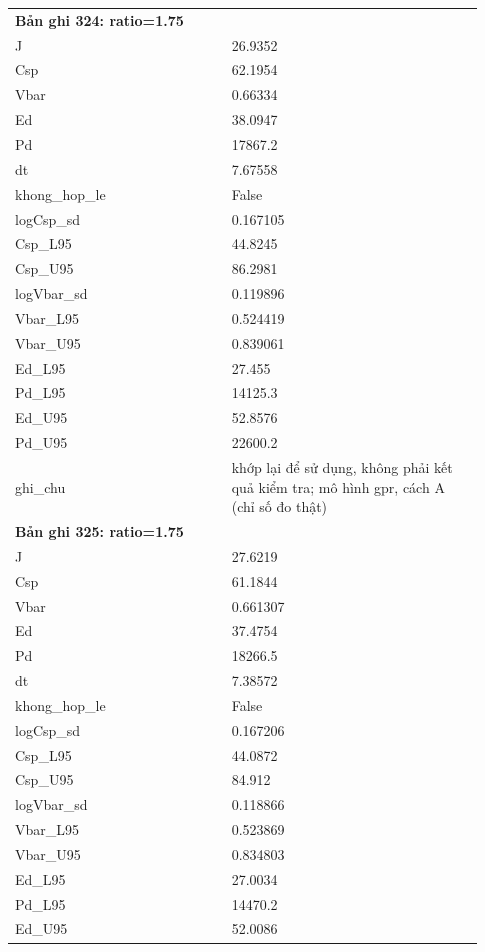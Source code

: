 \begin{longtable}{p{0.43\linewidth}p{0.50\linewidth}}
\midrule
\multicolumn{2}{p{0.95\linewidth}}{\textbf{Bản ghi 324: ratio=1.75}} \\
J & 26.9352 \\
Csp & 62.1954 \\
Vbar & 0.66334 \\
Ed & 38.0947 \\
Pd & 17867.2 \\
dt & 7.67558 \\
khong\_\allowbreak hop\_\allowbreak le & False \\
logCsp\_\allowbreak sd & 0.167105 \\
Csp\_\allowbreak L95 & 44.8245 \\
Csp\_\allowbreak U95 & 86.2981 \\
logVbar\_\allowbreak sd & 0.119896 \\
Vbar\_\allowbreak L95 & 0.524419 \\
Vbar\_\allowbreak U95 & 0.839061 \\
Ed\_\allowbreak L95 & 27.455 \\
Pd\_\allowbreak L95 & 14125.3 \\
Ed\_\allowbreak U95 & 52.8576 \\
Pd\_\allowbreak U95 & 22600.2 \\
ghi\_\allowbreak chu & khớp lại để sử dụng, không phải kết quả kiểm tra; mô hình gpr, cách A (chỉ số đo thật) \\
\midrule
\multicolumn{2}{p{0.95\linewidth}}{\textbf{Bản ghi 325: ratio=1.75}} \\
J & 27.6219 \\
Csp & 61.1844 \\
Vbar & 0.661307 \\
Ed & 37.4754 \\
Pd & 18266.5 \\
dt & 7.38572 \\
khong\_\allowbreak hop\_\allowbreak le & False \\
logCsp\_\allowbreak sd & 0.167206 \\
Csp\_\allowbreak L95 & 44.0872 \\
Csp\_\allowbreak U95 & 84.912 \\
logVbar\_\allowbreak sd & 0.118866 \\
Vbar\_\allowbreak L95 & 0.523869 \\
Vbar\_\allowbreak U95 & 0.834803 \\
Ed\_\allowbreak L95 & 27.0034 \\
Pd\_\allowbreak L95 & 14470.2 \\
Ed\_\allowbreak U95 & 52.0086 \\

\end{longtable}
